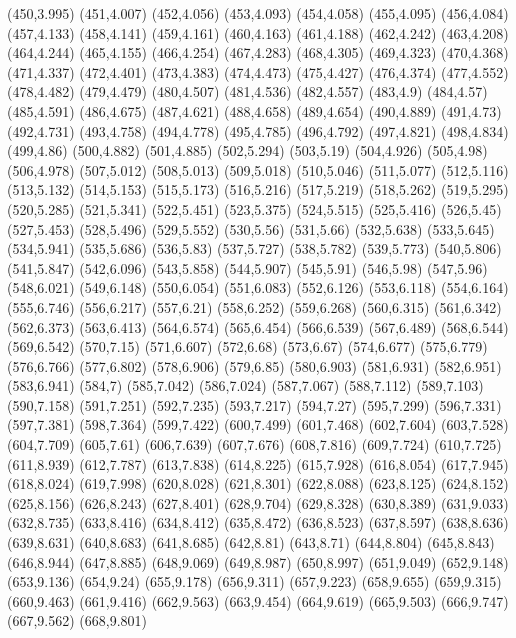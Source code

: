 (450,3.995)
(451,4.007)
(452,4.056)
(453,4.093)
(454,4.058)
(455,4.095)
(456,4.084)
(457,4.133)
(458,4.141)
(459,4.161)
(460,4.163)
(461,4.188)
(462,4.242)
(463,4.208)
(464,4.244)
(465,4.155)
(466,4.254)
(467,4.283)
(468,4.305)
(469,4.323)
(470,4.368)
(471,4.337)
(472,4.401)
(473,4.383)
(474,4.473)
(475,4.427)
(476,4.374)
(477,4.552)
(478,4.482)
(479,4.479)
(480,4.507)
(481,4.536)
(482,4.557)
(483,4.9)
(484,4.57)
(485,4.591)
(486,4.675)
(487,4.621)
(488,4.658)
(489,4.654)
(490,4.889)
(491,4.73)
(492,4.731)
(493,4.758)
(494,4.778)
(495,4.785)
(496,4.792)
(497,4.821)
(498,4.834)
(499,4.86)
(500,4.882)
(501,4.885)
(502,5.294)
(503,5.19)
(504,4.926)
(505,4.98)
(506,4.978)
(507,5.012)
(508,5.013)
(509,5.018)
(510,5.046)
(511,5.077)
(512,5.116)
(513,5.132)
(514,5.153)
(515,5.173)
(516,5.216)
(517,5.219)
(518,5.262)
(519,5.295)
(520,5.285)
(521,5.341)
(522,5.451)
(523,5.375)
(524,5.515)
(525,5.416)
(526,5.45)
(527,5.453)
(528,5.496)
(529,5.552)
(530,5.56)
(531,5.66)
(532,5.638)
(533,5.645)
(534,5.941)
(535,5.686)
(536,5.83)
(537,5.727)
(538,5.782)
(539,5.773)
(540,5.806)
(541,5.847)
(542,6.096)
(543,5.858)
(544,5.907)
(545,5.91)
(546,5.98)
(547,5.96)
(548,6.021)
(549,6.148)
(550,6.054)
(551,6.083)
(552,6.126)
(553,6.118)
(554,6.164)
(555,6.746)
(556,6.217)
(557,6.21)
(558,6.252)
(559,6.268)
(560,6.315)
(561,6.342)
(562,6.373)
(563,6.413)
(564,6.574)
(565,6.454)
(566,6.539)
(567,6.489)
(568,6.544)
(569,6.542)
(570,7.15)
(571,6.607)
(572,6.68)
(573,6.67)
(574,6.677)
(575,6.779)
(576,6.766)
(577,6.802)
(578,6.906)
(579,6.85)
(580,6.903)
(581,6.931)
(582,6.951)
(583,6.941)
(584,7)
(585,7.042)
(586,7.024)
(587,7.067)
(588,7.112)
(589,7.103)
(590,7.158)
(591,7.251)
(592,7.235)
(593,7.217)
(594,7.27)
(595,7.299)
(596,7.331)
(597,7.381)
(598,7.364)
(599,7.422)
(600,7.499)
(601,7.468)
(602,7.604)
(603,7.528)
(604,7.709)
(605,7.61)
(606,7.639)
(607,7.676)
(608,7.816)
(609,7.724)
(610,7.725)
(611,8.939)
(612,7.787)
(613,7.838)
(614,8.225)
(615,7.928)
(616,8.054)
(617,7.945)
(618,8.024)
(619,7.998)
(620,8.028)
(621,8.301)
(622,8.088)
(623,8.125)
(624,8.152)
(625,8.156)
(626,8.243)
(627,8.401)
(628,9.704)
(629,8.328)
(630,8.389)
(631,9.033)
(632,8.735)
(633,8.416)
(634,8.412)
(635,8.472)
(636,8.523)
(637,8.597)
(638,8.636)
(639,8.631)
(640,8.683)
(641,8.685)
(642,8.81)
(643,8.71)
(644,8.804)
(645,8.843)
(646,8.944)
(647,8.885)
(648,9.069)
(649,8.987)
(650,8.997)
(651,9.049)
(652,9.148)
(653,9.136)
(654,9.24)
(655,9.178)
(656,9.311)
(657,9.223)
(658,9.655)
(659,9.315)
(660,9.463)
(661,9.416)
(662,9.563)
(663,9.454)
(664,9.619)
(665,9.503)
(666,9.747)
(667,9.562)
(668,9.801)
